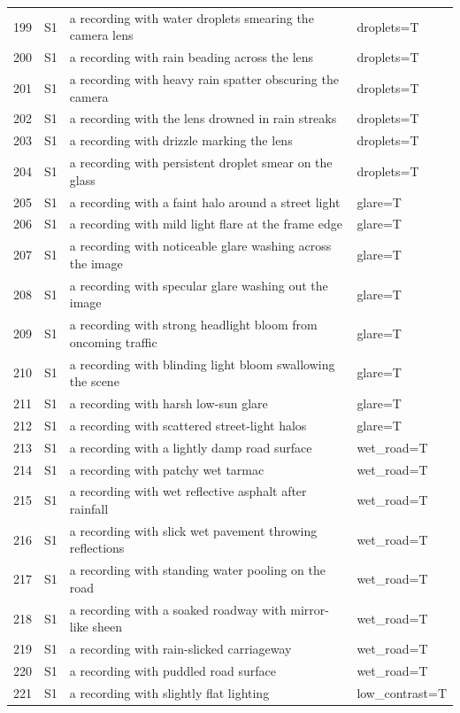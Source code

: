 \begin{longtable}{r l p{8.6cm} p{5.6cm}}
199 & S1 & a recording with water droplets smearing the camera lens & droplets=T\\
200 & S1 & a recording with rain beading across the lens & droplets=T\\
201 & S1 & a recording with heavy rain spatter obscuring the camera & droplets=T\\
202 & S1 & a recording with the lens drowned in rain streaks & droplets=T\\
203 & S1 & a recording with drizzle marking the lens & droplets=T\\
204 & S1 & a recording with persistent droplet smear on the glass & droplets=T\\
205 & S1 & a recording with a faint halo around a street light & glare=T\\
206 & S1 & a recording with mild light flare at the frame edge & glare=T\\
207 & S1 & a recording with noticeable glare washing across the image & glare=T\\
208 & S1 & a recording with specular glare washing out the image & glare=T\\
209 & S1 & a recording with strong headlight bloom from oncoming traffic & glare=T\\
210 & S1 & a recording with blinding light bloom swallowing the scene & glare=T\\
211 & S1 & a recording with harsh low-sun glare & glare=T\\
212 & S1 & a recording with scattered street-light halos & glare=T\\
213 & S1 & a recording with a lightly damp road surface & wet\_road=T\\
214 & S1 & a recording with patchy wet tarmac & wet\_road=T\\
215 & S1 & a recording with wet reflective asphalt after rainfall & wet\_road=T\\
216 & S1 & a recording with slick wet pavement throwing reflections & wet\_road=T\\
217 & S1 & a recording with standing water pooling on the road & wet\_road=T\\
218 & S1 & a recording with a soaked roadway with mirror-like sheen & wet\_road=T\\
219 & S1 & a recording with rain-slicked carriageway & wet\_road=T\\
220 & S1 & a recording with puddled road surface & wet\_road=T\\
221 & S1 & a recording with slightly flat lighting & low\_contrast=T\\

\end{longtable}
